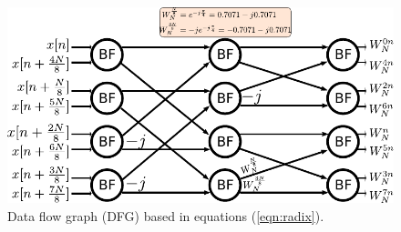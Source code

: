 \documentclass[journal,comsoc]{IEEEtran}
\begin{document}
\begin{figure} 
	\centering
	\includegraphics[width=\linewidth]{Diagramas/miSeccionFiguras/8PuntosRadix8Burbujas.pdf}
	\caption{Data flow graph (DFG) based in equations (\ref{eqn:radix}).}
	\label{fig:128ponits_dfg}
\end{figure}
\end{document}
